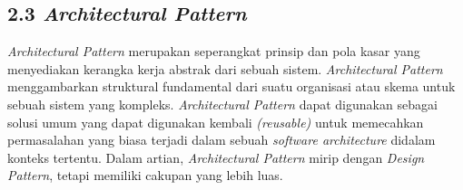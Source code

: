 \documentclass[a4paper]{article}
\begin{document}
\subsection*{2.3 \textit{Architectural Pattern}}
\textit{Architectural Pattern} merupakan seperangkat prinsip dan pola kasar yang menyediakan kerangka kerja abstrak dari sebuah sistem. \textit{Architectural Pattern} menggambarkan struktural fundamental dari suatu organisasi atau skema untuk sebuah sistem yang kompleks. \textit{Architectural Pattern} dapat digunakan sebagai solusi umum yang dapat digunakan kembali \textit{(reusable)} untuk memecahkan permasalahan yang biasa terjadi dalam sebuah \textit{software architecture} didalam konteks tertentu\autocite{architectural-pattern}. Dalam artian, \textit{Architectural Pattern} mirip dengan \textit{Design Pattern}, tetapi memiliki cakupan yang lebih luas\autocite{archi-pattern}.
\end{document}
